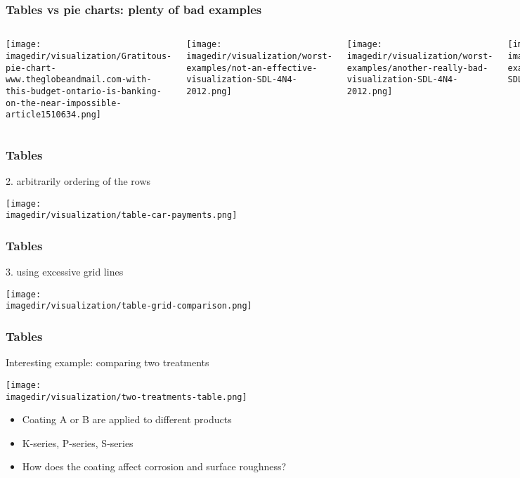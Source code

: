 \begin{frame}\frametitle{Tables vs pie charts: plenty of bad examples}
	\begin{columns}[t]
			\begin{center}
				\texttt{[image: \\imagedir/visualization/Gratitous-pie-chart-www.theglobeandmail.com-with-this-budget-ontario-is-banking-on-the-near-impossible-article1510634.png]}
			\end{center}
			\begin{center}
				\texttt{[image: \\imagedir/visualization/worst-examples/not-an-effective-visualization-SDL-4N4-2012.png]}
			\end{center}
			\begin{center}
				\texttt{[image: \\imagedir/visualization/worst-examples/another-really-bad-visualization-SDL-4N4-2012.png]}
			\end{center}
			\begin{center}
				\texttt{[image: \\imagedir/visualization/worst-examples/idiotic-pie-chart-SDL-4N4-2012.png]}
			\end{center}
	\end{columns}
	\vspace{12pt}
\end{frame}

\begin{frame}\frametitle{Tables}
	2. arbitrarily ordering of the rows 
	\begin{center}
		\texttt{[image: \\imagedir/visualization/table-car-payments.png]}
	\end{center}
\end{frame}

\begin{frame}\frametitle{Tables}
	3. using excessive grid lines 
	\begin{center}
		\texttt{[image: \\imagedir/visualization/table-grid-comparison.png]}
	\end{center}
\end{frame}

\begin{frame}\frametitle{Tables}
	Interesting example: comparing two treatments
	\begin{center}
		\texttt{[image: \\imagedir/visualization/two-treatments-table.png]}
	\end{center}
	\begin{itemize}
		\item	Coating A or B are applied to different products
		\item	K-series, P-series, S-series
		\item	How does the coating affect corrosion and surface roughness?
	\end{itemize}
\end{frame}

